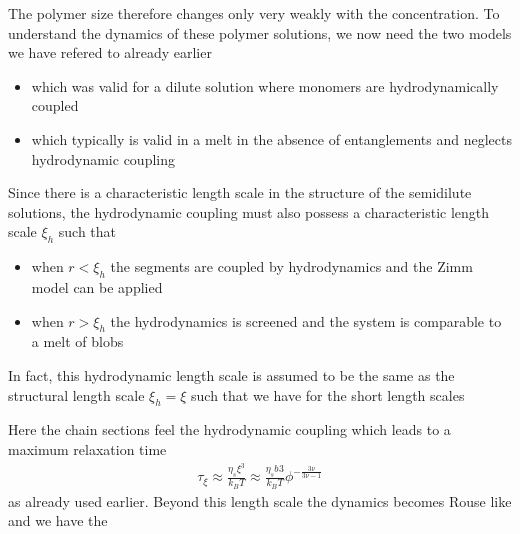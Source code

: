\documentclass[letterpaper,10pt,english]{sphinxmanual}
\begin{document}
\sphinxAtStartPar
The polymer size therefore changes only very weakly with the concentration. To understand the dynamics of these polymer solutions, we now need the two models we have refered to already earlier
\begin{itemize}
\item {} 
\sphinxAtStartPar
{} which was valid for a dilute solution where monomers are hydrodynamically coupled

\item {} 
\sphinxAtStartPar
{} which typically is valid in a melt in the absence of entanglements and neglects hydrodynamic coupling

\end{itemize}

\sphinxAtStartPar
Since there is a characteristic length scale in the structure of the semidilute solutions, the hydrodynamic coupling must also possess a characteristic length scale \(\xi_h\) such that
\begin{itemize}
\item {} 
\sphinxAtStartPar
when \(r<\xi_h\) the segments are coupled by hydrodynamics and the Zimm model can be applied

\item {} 
\sphinxAtStartPar
when \(r>\xi_h\) the hydrodynamics is screened and the system is comparable to a melt of blobs

\end{itemize}

\sphinxAtStartPar
In fact, this hydrodynamic length scale is assumed to be the same as the structural length scale \(\xi_h=\xi\) such that we have for the short length scales

\sphinxAtStartPar
{}

\sphinxAtStartPar
Here the chain sections feel the hydrodynamic coupling which leads to a maximum relaxation time
\begin{equation*}
\begin{split}\tau_{\xi}\approx \frac{\eta_s \xi^{3}}{k_B T}\approx \frac{\eta_s b^{}3}{k_B T}\phi^{-\frac{3\nu}{3\nu-1}}\end{split}
\end{equation*}
\sphinxAtStartPar
as already used earlier. Beyond this length scale the dynamics becomes Rouse like and we have the

\sphinxAtStartPar
{}
\end{document}

